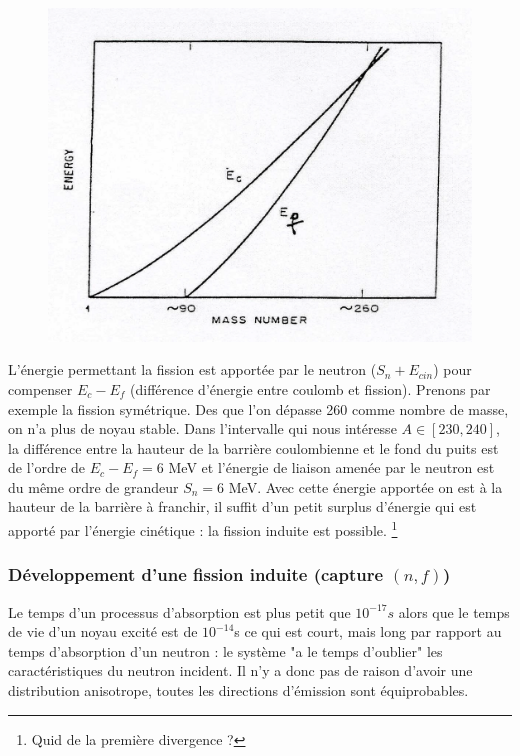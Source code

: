	\begin{figure}
	\vspace{-5mm}
	\includegraphics[scale=0.2]{ch1/image11.png}
	\end{figure}
L'énergie permettant la fission est apportée par le neutron ($S_n+E_{cin}$) pour compenser 
$E_c-E_f$ (différence d'énergie entre coulomb et fission). Prenons par exemple la fission 
symétrique. Des que l'on dépasse 260 comme nombre de masse, on n'a plus de noyau stable. Dans 
l'intervalle qui nous intéresse $A\in[230,240]$, la différence entre la hauteur de la barrière 
coulombienne et le fond du puits est de l'ordre de $E_c-E_f=6$ MeV et l'énergie de liaison amenée par 
le neutron est du même ordre de grandeur $S_n = 6$ MeV. Avec cette énergie apportée on est à 
la hauteur de la barrière à franchir, il suffit d'un petit surplus d'énergie qui est apporté 
par l'énergie cinétique : la fission induite est possible.
\footnote{Quid de la première divergence ?}\\


\subsubsection{Développement d'une fission induite (capture $(n,f)$)}
Le temps d'un processus d'absorption est plus petit que $10^{-17}s$ alors que le temps de vie d'un 
noyau excité est de $10^{-14}$s ce qui est court, mais long par rapport au temps 
d'absorption d'un neutron : le système "a le temps d'oublier" les caractéristiques du neutron 
incident. Il n'y a donc pas de raison d'avoir une distribution anisotrope, toutes les directions 
d'émission sont équiprobables.\\

